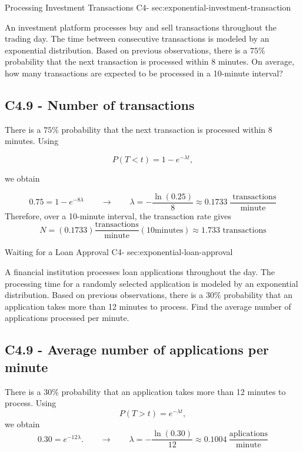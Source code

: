 	\sectionScored
	{Processing Investment Transactions}
	{C4-}
	{sec:exponential-investment-transaction}
	{
		An investment platform processes buy and sell transactions throughout
		the trading day. The time between consecutive transactions is modeled
		by an exponential distribution. Based on previous observations, there
		is a \(75\%\) probability that the next transaction is processed within
		8 minutes. On average, how many transactions are expected to be
		processed in a 10-minute interval?
		
		
		\subsection*{C4.9 - Number of transactions}
		\label{subsec:c4-find-rate-investment}
		
		There is a \(75\%\) probability that the next transaction is processed
		within 8 minutes. Using
		
		$$
		P(T<t)=1-e^{-\lambda t},
		$$
		
		we obtain
		
		$$
		0.75=1-e^{-8\lambda}
		\qquad \longrightarrow \qquad
		\lambda=-\frac{\ln(0.25)}{8}
		\approx0.1733 \>\frac{\text{ transactions}}{\text{minute}}
		$$
		Therefore, over a 10-minute interval, the transaction rate gives
		$$
		N=(0.1733)\frac{\text{transactions}}{\text{minute}}(10\text{minutes})
		\approx \boxed{1.733\text{ transactions}}
		$$
		
	}
	
	
	\sectionScored
	{Waiting for a Loan Approval}
	{C4-}
	{sec:exponential-loan-approval}
	{
		A financial institution processes loan applications throughout the
		day. The processing time for a randomly selected application is
		modeled by an exponential distribution. Based on previous observations,
		there is a \(30\%\) probability that an application takes more than
		12 minutes to process. Find the average number of applications
		processed per minute.
		
		
		\subsection*{C4.9 - Average number of applications per minute}
		\label{subsec:c4-find-rate-loan}
		
		There is a \(30\%\) probability that an application takes more than
		12 minutes to process. Using
		\[
		P(T>t)=e^{-\lambda t},
		\]
		we obtain
		\[
		0.30=e^{-12\lambda}.
		\qquad \longrightarrow \qquad
		\lambda=-\frac{\ln(0.30)}{12}
		\approx \boxed{0.1004  \>\frac{\text{aplications}}{\text{minute}}}
		\]
		
	}
	
